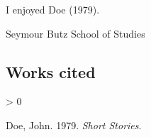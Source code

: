 
%
\newlength{\cslhangindent}
\setlength{\cslhangindent}{1.5em}
\newlength{\csllabelwidth}
\setlength{\csllabelwidth}{3em}
\newenvironment{CSLReferences}[2] %
 {%
  \setlength{\parindent}{0pt}
  \ifodd #1 \everypar{\setlength{\hangindent}{\cslhangindent}}\ignorespaces\fi
  \ifnum #2 > 0
  \setlength{\parskip}{#2\baselineskip}
  \fi
 }%
 {}
\usepackage{calc}
\newcommand{\CSLBlock}[1]{#1\hfill\break}
\newcommand{\CSLLeftMargin}[1]{\parbox[t]{\csllabelwidth}{#1}}
\newcommand{\CSLRightInline}[1]{\parbox[t]{\linewidth - \csllabelwidth}{#1}\break}
\newcommand{\CSLIndent}[1]{\hspace{\cslhangindent}#1}



I enjoyed Doe (1979).

Seymour Butz
School of Studies


\hypertarget{works-cited}{%
\subsection*{Works cited}\label{works-cited}}
\hypertarget{refs}{}
\begin{CSLReferences}{1}{0}
\leavevmode\hypertarget{ref-Doe}{}%
Doe, John. 1979. \emph{Short Stories}.

\end{CSLReferences}


%





